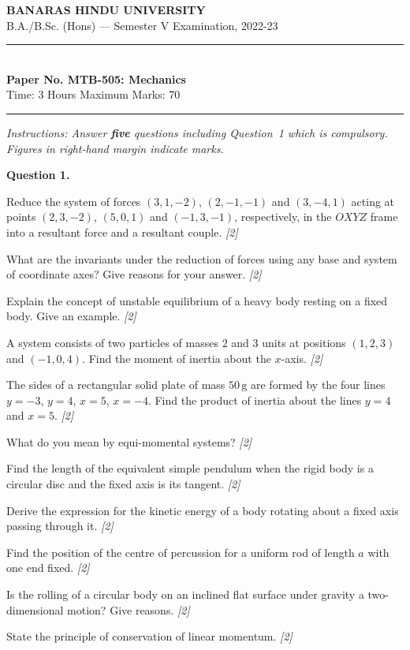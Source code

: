 \documentclass[11pt,a4paper]{article}
\newcommand{\pts}[1]{\hfill   \textit{[#1]}}
\begin{document}
\begin{center}
  {\large\bfseries BANARAS HINDU UNIVERSITY}\\[2pt]
  {\normalsize B.A./B.Sc. (Hons) --- Semester V Examination, 2022-23}\\[6pt]
  \rule{0.8\linewidth}{0.5pt}\\[6pt]
  {\large\bfseries Paper No. MTB-505: Mechanics}\\[4pt]
  {\normalsize Time: 3 Hours \hfill Maximum Marks: 70}
\end{center}
\rule{\linewidth}{0.4pt}
\smallskip



\noindent   \textit{Instructions: Answer   \textbf{five} questions including Question~1 which is compulsory. Figures in right-hand margin indicate marks.}
\bigskip




\noindent   \textbf{Question 1.}

\begin{parts}
  \item Reduce the system of forces $(3,1,-2)$, $(2,-1,-1)$ and $(3,-4,1)$ acting at points $(2,3,-2)$, $(5,0,1)$ and $(-1,3,-1)$, respectively, in the $OXYZ$ frame into a resultant force and a resultant couple. \pts{2}
  \item What are the invariants under the reduction of forces using any base and system of coordinate axes? Give reasons for your answer. \pts{2}
  \item Explain the concept of unstable equilibrium of a heavy body resting on a fixed body. Give an example. \pts{2}
  \item A system consists of two particles of masses $2$ and $3$ units at positions $(1,2,3)$ and $(-1,0,4)$. Find the moment of inertia about the $x$-axis. \pts{2}
  \item The sides of a rectangular solid plate of mass $50\, \text{g}$ are formed by the four lines $y = -3$, $y = 4$, $x = 5$, $x = -4$. Find the product of inertia about the lines $y = 4$ and $x = 5$. \pts{2}
  \item What do you mean by equi-momental systems? \pts{2}
  \item Find the length of the equivalent simple pendulum when the rigid body is a circular disc and the fixed axis is its tangent. \pts{2}
  \item Derive the expression for the kinetic energy of a body rotating about a fixed axis passing through it. \pts{2}
  \item Find the position of the centre of percussion for a uniform rod of length $a$ with one end fixed. \pts{2}
  \item Is the rolling of a circular body on an inclined flat surface under gravity a two-dimensional motion? Give reasons. \pts{2}
  \item State the principle of conservation of linear momentum. \pts{2}
\end{parts}
\end{document}
